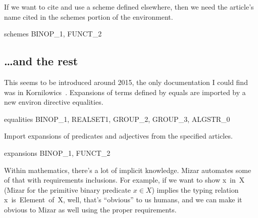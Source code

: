 If we want to cite and use a scheme defined elsewhere, then we need the
article's name cited in the {\Tt{}schemes\nwendquote} portion of the environment.

\nwenddocs{}\endmoddef\nwstartdeflinemarkup{}\nwenddeflinemarkup
schemes BINOP_1, FUNCT_2

\nwendcode{}\nwdocspar

\subsection{\dots and the rest}

This seems to be introduced around 2015, the only documentation I could
find was in Kornilowics~\cite{kornilowicz2015definitional}.
Expansions of terms defined by {\Tt{}equals\nwendquote} are imported by a new
{\Tt{}environ\nwendquote} directive {\Tt{}equalities\nwendquote}.

\nwenddocs{}\endmoddef\nwstartdeflinemarkup{}\nwenddeflinemarkup
equalities BINOP_1, REALSET1, GROUP_2, GROUP_3, ALGSTR_0

\nwendcode{}\nwdocspar

Import expansions of predicates and adjectives from the specified
articles.

\nwenddocs{}\endmoddef\nwstartdeflinemarkup{}\nwenddeflinemarkup
expansions BINOP_1, FUNCT_2

\nwendcode{}\nwdocspar

 Within mathematics, there's a lot of implicit
knowledge. Mizar automates some of that with {\Tt{}requirements\nwendquote}
inclusions. For example, if we want to show {\Tt{}x\ in\ X\nwendquote}
(Mizar for the primitive binary predicate $x\in X$) implies
the typing relation {\Tt{}x\ is\ Element\ of\ X\nwendquote}, well, that's ``obvious'' to
us humans, and we can make it obvious to Mizar as well using the proper
requirements.

